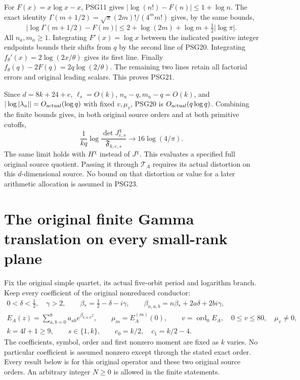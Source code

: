 \documentclass[10pt]{article}
\begin{document}
For \(F(x)=x\log x-x\), PSG11 gives
\(|\log(n!)-F(n)|\le1+\log n\).
The exact identity
\(\Gamma(m+1/2)=\sqrt\pi(2m)!/(4^m m!)\) gives, by the same bounds,
\[
 |\log\Gamma(m+1/2)-F(m)|
       \le2+\log(2m)+\log m+\tfrac12|\log\pi|.
\]
All \(n_a,m_a\ge1\).
Integrating \(F'(x)=\log x\) between the indicated positive integer
endpoints bounds their shifts from \(q\) by the second line of PSG20.
Integrating \(f_\theta'(x)=2\log(2x/\theta)\) gives its first line.
Finally \(f_\theta(q)-2F(q)=2q\log(2/\theta)\).
The remaining two lines retain all factorial errors and original
leading scalars. This proves PSG21.

Since \(d=8k+24+e\), \(\ell_s=O(k)\),
\(n_a-q,m_a-q=O(k)\), and
\(|\log|\lambda_a||=O_{\rm actual}(\log q)\) with fixed \(v,\mu_v\),
PSG20 is \(O_{\rm actual}(q\log q)\).
Combining the finite bounds gives, in both original source orders
and at both primitive cutoffs,
\[
 \boxed{\quad
 \frac1{kq}\log\frac{\det J^\chi_{e,s}}{\mathfrak F_{k,e,s}}
                   \longrightarrow16\log(4/\pi).
 \quad}\tag{PSG23}
\]
The same limit holds with \(H^\chi\) instead of \(J^\chi\).
This evaluates a specified full original source quotient.
Passing it through \(\mathcal T_A\) requires its actual distortion
on this \(d\)-dimensional source. No bound on that distortion or
value for a later arithmetic allocation is assumed in PSG23.



\section{The original finite Gamma translation on every small-rank plane}
\label{sec:SGT}

Fix the original simple quartet, its actual five-orbit period and logarithm
branch. Keep every coefficient of the original nonreduced conductor:
\[
\begin{gathered}
 0<\delta<\tfrac12,\quad\gamma>2,\qquad
 \beta_*=\tfrac12-\delta-i\gamma,\qquad
 \beta_{n,a,b}=n\beta_*+2a\delta+2bi\gamma,\\
 E_A(z)=\sum_{a,b=0}^8a_{ab}e^{\beta_{8,a,b}z},\qquad
 \mu_m=E_A^{(m)}(0),\qquad
 v=\operatorname{ord}_0E_A,\quad0\le v\le80,\quad\mu_v\ne0,\\
 k=4l+1\ge9,\qquad s\in\{1,k\},\qquad
 c_0=k/2,\quad c_1=k/2-4 .
\end{gathered}\tag{SGT1}
\]
The coefficients, symbol, order and first nonzero moment are fixed as
$k$ varies. No particular coefficient is assumed nonzero except through
the stated exact order. Every result below is for this original operator
and these two original source orders. An arbitrary integer $N\ge0$ is
allowed in the finite statements.
\end{document}
